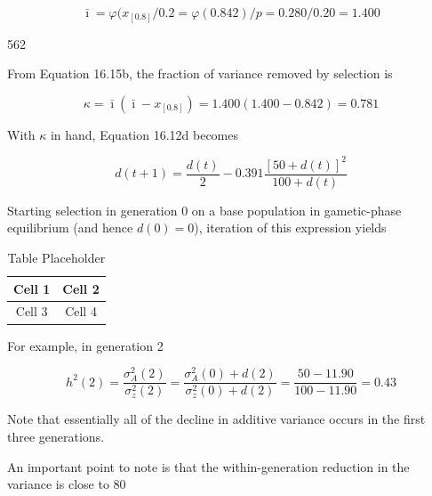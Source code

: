 \documentclass{article}
\begin{document}
\begin{equation}
\bar{\imath}=\varphi(x_{[0.8]}/0.2=\varphi(0.842)/p=0.280/0.20=1.400
\end{equation}

562

From Equation 16.15b, the fraction of variance removed by selection is

\begin{equation}
\kappa=\bar{\imath}\left(\bar{\imath}-x_{[0.8]}\right)=1.400\left(1.400-0.842\right)=0.781
\end{equation}

With  $ \kappa $ in hand, Equation 16.12d becomes

\begin{equation}
d(t+1)=\frac{d(t)}{2}-0.391\frac{\left[50+d(t)\right]^{2}}{100+d(t)}
\end{equation}

Starting selection in generation 0 on a base population in gametic-phase equilibrium (and hence  $ d(0) = 0 $), iteration of this expression yields

\begin{table}[h]
\centering
\begin{tabular}{|c|c|}
\hline
Cell 1 & Cell 2 \\
\hline
Cell 3 & Cell 4 \\
\hline
\end{tabular}
\caption{Table Placeholder}
\end{table}

For example, in generation 2

\begin{equation}
h^{2}(2)=\frac{\sigma_{A}^{2}(2)}{\sigma_{z}^{2}(2)}=\frac{\sigma_{A}^{2}(0)+d(2)}{\sigma_{z}^{2}(0)+d(2)}=\frac{50-11.90}{100-11.90}=0.43
\end{equation}

Note that essentially all of the decline in additive variance occurs in the first three generations.

An important point to note is that the within-generation reduction in the variance is close to 80%
\end{document}
